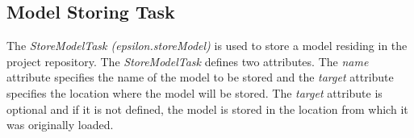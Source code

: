 \subsection{Model Storing Task}
The \textit{StoreModelTask (epsilon.storeModel)} is used to store a model residing in the project repository. The \textit{StoreModelTask} defines two attributes. The \textit{name} attribute specifies the name of the model to be stored and the \textit{target} attribute specifies the location where the model will be stored. The \textit{target} attribute is optional and if it is not defined, the model is stored in the location from which it was originally loaded.